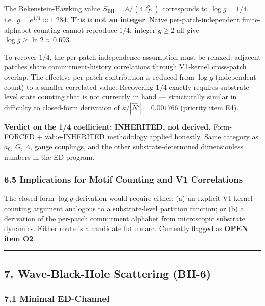 \documentclass[
  11pt,
  a4paper,
]{article}
\begin{document}
The Bekenstein-Hawking value \(S_\mathrm{BH} = A/(4\ell_P^2)\)
corresponds to \(\log g = 1/4\), i.e.~\(g = e^{1/4} \approx 1.284\).
This is \textbf{not an integer}. Naive per-patch-independent
finite-alphabet counting cannot reproduce \(1/4\): integer \(g \geq 2\)
all give \(\log g \geq \ln 2 \approx 0.693\).

To recover \(1/4\), the per-patch-independence assumption must be
relaxed: adjacent patches share commitment-history correlations through
V1-kernel cross-patch overlap. The effective per-patch contribution is
reduced from \(\log g\) (independent count) to a smaller correlated
value. Recovering \(1/4\) exactly requires substrate-level state
counting that is not currently in hand --- structurally similar in
difficulty to closed-form derivation of \(\kappa/|\hat{N}'| = 0.001766\)
(priority item E4).

\textbf{Verdict on the 1/4 coefficient: INHERITED, not derived.}
Form-FORCED + value-INHERITED methodology applied honestly. Same
category as \(a_0\), \(G\), \(\Lambda\), gauge couplings, and the other
substrate-determined dimensionless numbers in the ED program.

\subsubsection{6.5 Implications for Motif Counting and V1
Correlations}\label{implications-for-motif-counting-and-v1-correlations}

The closed-form \(\log g\) derivation would require either: (a) an
explicit V1-kernel-counting argument analogous to a substrate-level
partition function; or (b) a derivation of the per-patch commitment
alphabet from microscopic substrate dynamics. Either route is a
candidate future arc. Currently flagged as \textbf{OPEN item O2}.

\begin{center}\rule{0.5\linewidth}{0.5pt}\end{center}

\subsection{7. Wave-Black-Hole Scattering
(BH-6)}\label{wave-black-hole-scattering-bh-6}

\subsubsection{7.1 Minimal ED-Channel}\label{minimal-ed-channel}
\end{document}
